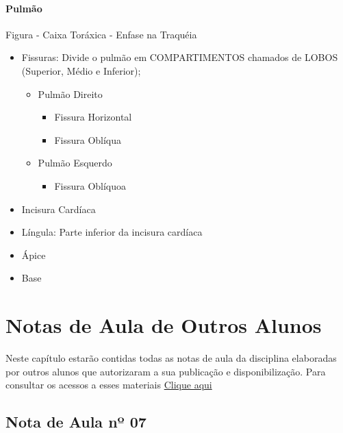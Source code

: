 \documentclass[
]{book}
\providecommand{\tightlist}{%
  \setlength{\itemsep}{0pt}\setlength{\parskip}{0pt}}
\begin{document}
\hypertarget{pulmuxe3o}{%
\subsubsection{Pulmão}\label{pulmuxe3o}}

Figura - Caixa Toráxica - Enfase na Traquéia

\begin{itemize}
\tightlist
\item
  Fissuras: Divide o pulmão em COMPARTIMENTOS chamados de LOBOS (Superior, Médio e Inferior);

  \begin{itemize}
  \tightlist
  \item
    Pulmão Direito

    \begin{itemize}
    \tightlist
    \item
      Fissura Horizontal
    \item
      Fissura Oblíqua
    \end{itemize}
  \item
    Pulmão Esquerdo

    \begin{itemize}
    \tightlist
    \item
      Fissura Oblíquoa
    \end{itemize}
  \end{itemize}
\item
  Incisura Cardíaca
\item
  Língula: Parte inferior da incisura cardíaca
\item
  Ápice
\item
  Base
\end{itemize}

\hypertarget{notas-de-aula-de-outros-alunos}{%
\chapter{Notas de Aula de Outros Alunos}\label{notas-de-aula-de-outros-alunos}}

Neste capítulo estarão contidas todas as notas de aula da disciplina elaboradas por outros alunos que autorizaram a sua publicação e disponibilização. Para consultar os acessos a esses materiais \href{https://app.bitly.com/Bi6shp8v5bx/bitlinks/3ruv6mM/details?filterActive=true\&tags=Anatomia}{Clique aqui}

\hypertarget{nota-de-aula-nuxba-07-1}{%
\section{Nota de Aula nº 07}\label{nota-de-aula-nuxba-07-1}}
\end{document}
